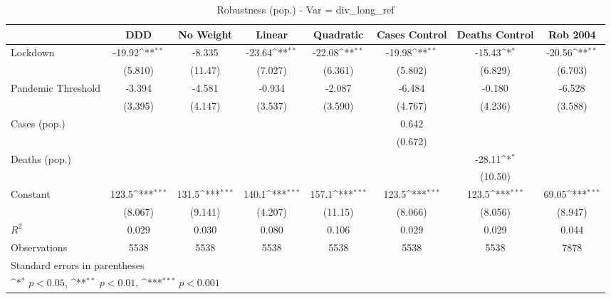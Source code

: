 \documentclass{article}
\begin{document}
{
\def\sym#1{\ifmmode^{#1}\else\(^{#1}\)\fi}
\begin{longtable}{l*{7}{c}}
\caption{Robustness (pop.) - Var = div\_long\_ref}\\
\hline\hline\endfirsthead\hline\endhead\hline\endfoot\endlastfoot
                &\multicolumn{1}{c}{DDD}&\multicolumn{1}{c}{No Weight}&\multicolumn{1}{c}{Linear}&\multicolumn{1}{c}{Quadratic}&\multicolumn{1}{c}{Cases Control}&\multicolumn{1}{c}{Deaths Control}&\multicolumn{1}{c}{Rob 2004}\\
\hline
Lockdown        &   -19.92\sym{**} &   -8.335         &   -23.64\sym{**} &   -22.08\sym{**} &   -19.98\sym{**} &   -15.43\sym{*}  &   -20.56\sym{**} \\
                &  (5.810)         &  (11.47)         &  (7.027)         &  (6.361)         &  (5.802)         &  (6.829)         &  (6.703)         \\
Pandemic Threshold&   -3.394         &   -4.581         &   -0.934         &   -2.087         &   -6.484         &   -0.180         &   -6.528         \\
                &  (3.395)         &  (4.147)         &  (3.537)         &  (3.590)         &  (4.767)         &  (4.236)         &  (3.588)         \\
Cases (pop.)    &                  &                  &                  &                  &    0.642         &                  &                  \\
                &                  &                  &                  &                  &  (0.672)         &                  &                  \\
Deaths (pop.)   &                  &                  &                  &                  &                  &   -28.11\sym{*}  &                  \\
                &                  &                  &                  &                  &                  &  (10.50)         &                  \\
Constant        &    123.5\sym{***}&    131.5\sym{***}&    140.1\sym{***}&    157.1\sym{***}&    123.5\sym{***}&    123.5\sym{***}&    69.05\sym{***}\\
                &  (8.067)         &  (9.141)         &  (4.207)         &  (11.15)         &  (8.066)         &  (8.056)         &  (8.947)         \\
\hline
\(R^{2}\)       &    0.029         &    0.030         &    0.080         &    0.106         &    0.029         &    0.029         &    0.044         \\
Observations    &     5538         &     5538         &     5538         &     5538         &     5538         &     5538         &     7878         \\
\hline\hline
\multicolumn{8}{l}{\footnotesize Standard errors in parentheses}\\
\multicolumn{8}{l}{\footnotesize \sym{*} \(p<0.05\), \sym{**} \(p<0.01\), \sym{***} \(p<0.001\)}\\
\end{longtable}
}
\end{document}
